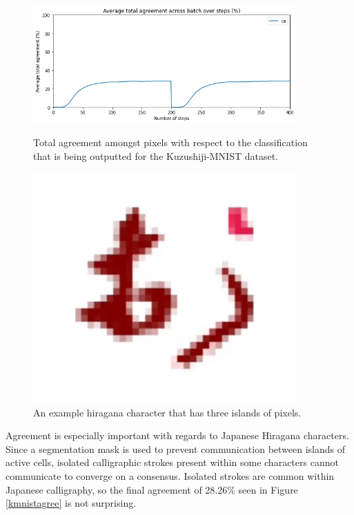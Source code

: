 \documentclass[conference]{IEEEtran}
\begin{document}
\begin{figure}
    \centering
    \begin{minipage}{0.24\textwidth}
        \centering
        \includegraphics[width=0.9\textwidth]{kmnist/agreement.png} %
        \caption{Total agreement amongst pixels with respect to the classification that is being outputted for the Kuzushiji-MNIST dataset.}
        \label{kmnistagree}
    \end{minipage}\hfill
    \begin{minipage}{0.24\textwidth}
        \centering
        \includegraphics[width=0.9\textwidth]{resources/islandexamplekmnist.png} %
        \caption{An example hiragana character that has three islands of pixels.}
        \label{kmnistislands}
    \end{minipage}
\end{figure}

Agreement is especially important with regards to Japanese Hiragana characters. Since a segmentation mask is used to prevent communication between islands of active cells, isolated calligraphic strokes present within some characters cannot communicate to converge on a consensus. Isolated strokes are common within Japanese calligraphy, so the final agreement of 28.26\% seen in Figure \ref{kmnistagree} is not surprising. 
\end{document}
